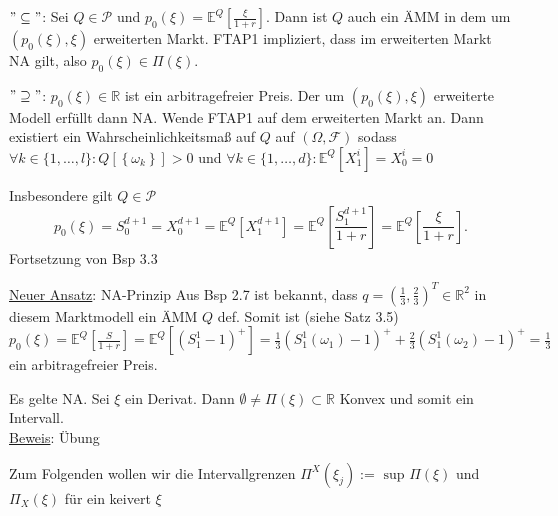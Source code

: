 \documentclass[11.5 pt, a4paper]{memoir}
\begin{document}
$ " \subseteq" $: Sei $Q \in \mathcal{P}$ und $p_0(\xi) = \mathbb{E}^Q \left[ \frac{\xi}{1+r} \right]$.
Dann ist $Q$ auch ein ÄMM in dem um $\left( p_0(\xi), \xi \right)$ erweiterten Markt. FTAP1 impliziert, dass im erweiterten 
Markt NA gilt, also $p_0(\xi) \in \Pi(\xi)$.\break

$ "\supseteq"$: $p_0(\xi) \in \mathbb{R}$ ist ein arbitragefreier Preis. Der um $\left( p_0(\xi), \xi \right)$ erweiterte Modell 
erfüllt dann NA. Wende FTAP1 auf dem erweiterten Markt an. Dann existiert ein Wahrscheinlichkeitsmaß auf $ Q $ auf $ \left( \Omega , 
\mathcal{F}\right) $ sodass $\forall k \in \{1, \dots, l \} : Q \left[ \left\{ \omega_k \right\}  \right] > 0$ und
$\forall k \in \{1, \dots, d\}: \mathbb{E}^Q \left[ X_1^{i} \right] = X_0^{i} = 0$ 

Insbesondere gilt $ Q \in \mathcal{P} $ 
\[
p_0(\xi) = S_0^{d+1} = X_0^{d+1} = \mathbb{E}^{Q} \left[ X_1^{d+1} \right] =  \mathbb{E}^Q \left[ \frac{S_1^{d+1}}{1+r} \right] = \mathbb{E}^Q \left[ \frac{\xi}{1+r} \right].
\]
 Fortsetzung von Bsp 3.3

\underline{Neuer Ansatz}: NA-Prinzip Aus Bsp 2.7 ist bekannt, dass $ q = \left( \frac{1}{3} , \frac{2}{3}  \right) ^{T}
\in \mathbb{R}^{2 }$ in diesem Marktmodell ein ÄMM $ Q $ def. Somit ist (siehe Satz 3.5)
$ p_0 (\xi) = \mathbb{E} ^{Q} \left[ \frac{S}{1+r}  \right] =  \mathbb{E} ^{Q} \left[  \left( S_1^{1} - 1 \right) ^{+}
\right] = \frac{1}{3} \left( S_1^{1} (\omega_1) -1 \right)^{+} + \frac{2}{3} \left( S_1^{1} (\omega_2) -1 \right)^{+}
= \frac{1}{3} $ ein arbitragefreier Preis. 

Es gelte NA. Sei $ \xi $ ein Derivat. Dann $ \emptyset \neq \Pi (\xi) \subset \mathbb{R} $ Konvex und somit ein Intervall. \\
\underline{Beweis}: Übung

Zum Folgenden wollen wir die Intervallgrenzen $ \Pi ^{X} (\xi_j) := \text{ sup } \Pi (\xi) $ und $ \Pi_{X} (\xi) $ 
für ein keivert $ \xi $ 
\end{document}
